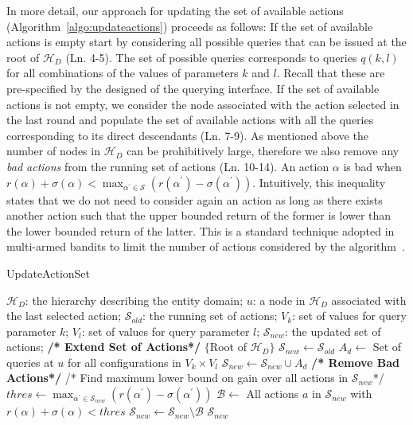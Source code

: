 \documentclass{vldb}
\newcommand{\hierarchy}{\mathcal{H}_D}
\begin{document}
In more detail, our approach for updating the set of available actions (Algorithm~\ref{algo:updateactions}) proceeds as follows: If the set of available actions is empty start by considering all possible queries that can be issued at the root of $\hierarchy$ (Ln. 4-5). The set of possible queries corresponds to queries $q(k,l)$ for all combinations of the values of parameters $k$ and $l$. Recall that these are pre-specified by the designed of the querying interface. If the set of available actions is not empty, we consider the node associated with the action selected in the last round and populate the set of available actions with all the queries corresponding to its direct descendants (Ln. 7-9). As mentioned above the number of nodes in $\hierarchy$ can be prohibitively large, therefore we also remove any {\em bad actions} from the running set of actions (Ln.  10-14). 
An action $\alpha$ is bad when $r(\alpha) + \sigma(\alpha) < \max_{\alpha^{\prime} \in \mathcal{S}} (r(\alpha^{\prime}) - \sigma(\alpha^{\prime}))$. Intuitively, this inequality states that we do not need to consider again an action as long as there exists another action such that the upper bounded return of the former is lower than the lower bounded return of the latter. This is a standard technique adopted in multi-armed bandits to limit the number of actions considered by the algorithm~\cite{EvenDar06actionelimination}. 
\begin{algorithm}[h]
\caption{UpdateActionSet}
\label{algo:updateactions}
\begin{algorithmic}[1]
 $\hierarchy$: the hierarchy describing the entity domain; $u$: a node in $\hierarchy$ associated with the last selected action; $\mathcal{S}_{old}$: the running set of actions; $V_k$: set of values for query parameter $k$; $V_l$: set of values for query parameter $l$;
 $\mathcal{S}_{new}$: the updated set of actions;
\STATE \textbf{/* Extend Set of Actions*/}
	\RETURN $\{$Root of $\hierarchy \}$
\ENDIF 
\STATE $\mathcal{S}_{new} \leftarrow \mathcal{S}_{old}$
\STATE $A_d \leftarrow$ Set of queries at $u$ for all configurations in $V_k \times V_l$
\STATE $\mathcal{S}_{new} \leftarrow \mathcal{S}_{new} \cup A_d$
\ENDFOR
\STATE \textbf{/* Remove Bad Actions*/}
\STATE /* Find maximum lower bound on gain over all actions in $\mathcal{S}_{new}$*/
\STATE $thres \leftarrow \max_{\alpha^{\prime} \in \mathcal{S}_{new}} (r(\alpha^{\prime}) - \sigma(\alpha^{\prime}))$  
\STATE $\mathcal{B} \leftarrow$ All actions $a$ in $\mathcal{S}_{new}$ with $r(\alpha) + \sigma(\alpha) < thres$
\STATE $\mathcal{S}_{new} \leftarrow \mathcal{S}_{new} \setminus \mathcal{B}$
\RETURN $\mathcal{S}_{new}$
\end{algorithmic}
\end{algorithm}
\end{document}
